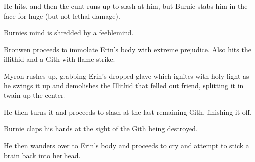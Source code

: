 He hits, and then the cunt runs up to slash at him, but Burnie stabs him in the face for huge (but not lethal damage).\medskip

Burnies mind is shredded by a feeblemind.\medskip

Bronwen proceeds to immolate Erin’s body with extreme prejudice. Also hits the illithid and a Gith with flame strike.\medskip

Myron rushes up, grabbing Erin’s dropped glave which ignites with holy light as he swings it up and demolishes the Illithid that felled out friend, splitting it in twain up the center.\medskip

He then turns it and proceeds to slash at the last remaining Gith, finishing it off.\medskip

Burnie claps his hands at the sight of the Gith being destroyed.\medskip

He then wanders over to Erin’s body and proceeds to cry and attempt to stick a brain back into her head.\medskip

\vspace*{5mm}
